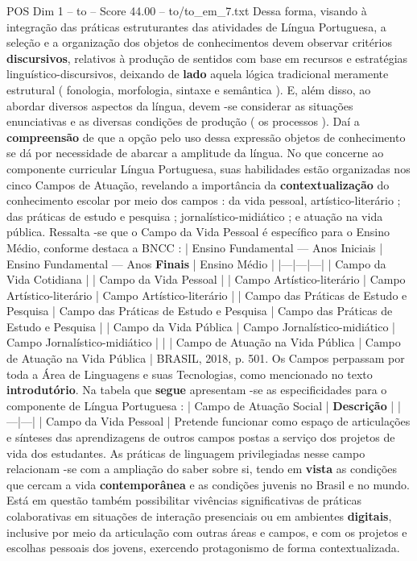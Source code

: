 \begin{textsample}{POS Dim 1 – to – Score 44.00 – to/to\_em\_7.txt}
Dessa forma, visando à integração das práticas estruturantes das atividades de Língua Portuguesa, a seleção e a organização dos objetos de conhecimentos devem observar critérios \textbf{discursivos}, relativos à produção de sentidos com base em recursos e estratégias linguístico-discursivos, deixando de \textbf{lado} aquela lógica tradicional meramente estrutural ( fonologia, morfologia, sintaxe e semântica ).
E, além disso, ao abordar diversos aspectos da língua, devem -se considerar as situações enunciativas e as diversas condições de produção ( os processos ).
Daí a \textbf{compreensão} de que a opção pelo uso dessa expressão objetos de conhecimento se dá por necessidade de abarcar a amplitude da língua.
No que concerne ao componente curricular Língua Portuguesa, suas habilidades estão organizadas nos cinco Campos de Atuação, revelando a importância da \textbf{contextualização} do conhecimento escolar por meio dos campos : da vida pessoal, artístico-literário ; das práticas de estudo e pesquisa ; jornalístico-midiático ; e atuação na vida pública.
Ressalta -se que o Campo da Vida Pessoal é específico para o Ensino Médio, conforme destaca a BNCC : | Ensino Fundamental — Anos Iniciais | Ensino Fundamental — Anos \textbf{Finais} | Ensino Médio | |---|---|---| | Campo da Vida Cotidiana | | Campo da Vida Pessoal | | Campo Artístico-literário | Campo Artístico-literário | Campo Artístico-literário | | Campo das Práticas de Estudo e Pesquisa | Campo das Práticas de Estudo e Pesquisa | Campo das Práticas de Estudo e Pesquisa | | Campo da Vida Pública | Campo Jornalístico-midiático | Campo Jornalístico-midiático | | | Campo de Atuação na Vida Pública | Campo de Atuação na Vida Pública | BRASIL, 2018, p. 501.
Os Campos perpassam por toda a Área de Linguagens e suas Tecnologias, como mencionado no texto \textbf{introdutório}.
Na tabela que \textbf{segue} apresentam -se as especificidades para o componente de Língua Portuguesa : | Campo de Atuação Social | \textbf{Descrição} | |---|---| | Campo da Vida Pessoal | Pretende funcionar como espaço de articulações e sínteses das aprendizagens de outros campos postas a serviço dos projetos de vida dos estudantes.
As práticas de linguagem privilegiadas nesse campo relacionam -se com a ampliação do saber sobre si, tendo em \textbf{vista} as condições que cercam a vida \textbf{contemporânea} e as condições juvenis no Brasil e no mundo.
Está em questão também possibilitar vivências significativas de práticas colaborativas em situações de interação presenciais ou em ambientes \textbf{digitais}, inclusive por meio da articulação com outras áreas e campos, e com os projetos e escolhas pessoais dos jovens, exercendo protagonismo de forma contextualizada.

\end{textsample}
